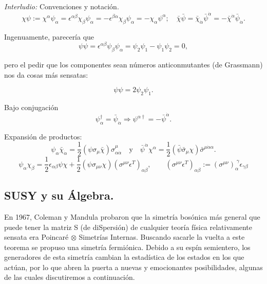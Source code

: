 \documentclass[10pt,a4paper]{beamer}
\begin{document}
\begin{frame}{\emph{Interludio:} Convenciones y notación.}
\[
  \chi\psi := \chi^\alpha\psi_\alpha =
  \epsilon^{\alpha\beta}\chi_\beta\psi_\alpha =
  -\epsilon^{\beta\alpha}\chi_\beta\psi_\alpha = -
  \chi_\alpha\psi^\alpha; 
  \quad \bar\chi\bar\psi =
  \bar\chi_{\dot\alpha}\bar\psi^{\dot\alpha} =
  -\bar\chi^{\dot\alpha}\bar\psi_{\dot\alpha}.
   \]

   Ingenuamente, parecería que
\[
  \psi\psi = \epsilon^{\alpha\beta} \psi_\beta\psi_\alpha = \psi_2\psi_1 -
  \psi_1\psi_2 = 0,
\]

pero el pedir que los componentes sean números anticonmutantes (de Grassmann) nos
da cosas más sensatas:


\[
  \psi\psi = 2 \psi_2\psi_1.
\]

 Bajo conjugación
\[
  \psi_\alpha^\dag = \bar\psi_{\dot\alpha} \Rightarrow \psi^{\alpha \dag} = -
  \bar\psi^{\dot\alpha}.
\]


Expansión de productos:
\begin{equation}
  \psi_\alpha\bar\chi_{\dot\alpha} = \frac{1}{2}\left(\psi\sigma_\mu\bar\chi
  \right)\sigma^\mu_{\alpha\dot\alpha}
  \quad \text{y} \quad
  \bar\psi^{\dot\alpha}\chi^{\alpha} = \frac{1}{2}\left(\bar\psi\bar\sigma_\mu\chi
  \right)\bar\sigma^{\mu\dot\alpha\alpha} .
  \label{eq:sigma}
\end{equation}
\[
  \psi_\alpha\chi_\beta
  =
  \frac{1}{2} \epsilon_{\alpha\beta} \psi\chi
  +
  \frac{1}{2} \left(\psi\sigma_{\mu\nu} \chi\right)
  \left(\sigma^{\mu\nu}\epsilon^T\right)_{\alpha\beta},\quad \quad
  \left(\sigma^{\mu\nu}\epsilon^T\right)_{\alpha\beta} :=
  \left(\sigma^{\mu\nu}\right)_\alpha^{\;\gamma} \epsilon_{\gamma\beta}
\]
\end{frame}

\subsection{SUSY y su Álgebra.}
\begin{frame}{\subsecname}

En 1967, Coleman y Mandula probaron que la simetría bosónica más general que puede tener
la matriz S (de diSpersión) de cualquier teoría física relativamente sensata era
Poincaré $\otimes$ Simetrías Internas. Buscando sacarle la vuelta a este teorema
se propuso una simetría fermiónica. Debido a su espín semientero, los
generadores de esta simetría cambian la estadística de los estados en los que
actúan, por lo que abren la puerta a nuevas y emocionantes posibilidades,
algunas de las cuales discutiremos a continuación.
\end{frame}
\end{document}
